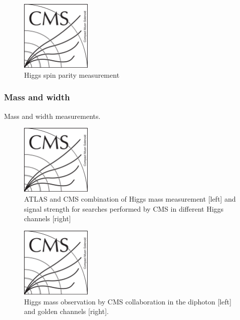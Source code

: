 \begin{figure}[!Hhtbp]
  \begin{center}
    \includegraphics[width=0.3\textwidth]{figs/CMSlogo.png}
    \caption{Higgs spin parity measurement}
    \label{fig:HiggsSpinParity}
  \end{center}
\end{figure}

\subsubsection{Mass and width}

Mass and width measurements.

\begin{figure}[!Hhtbp]
  \begin{center}
    \includegraphics[width=0.3\textwidth]{figs/CMSlogo.png}
    \caption{ATLAS and CMS combination of Higgs mass measurement [left] and signal strength for searches performed by CMS in different Higgs channels [right]}
    \label{fig:HiggsMass}
  \end{center}
\end{figure}

\begin{figure}[!Hhtbp]
  \begin{center}
    \includegraphics[width=0.3\textwidth]{figs/CMSlogo.png}
    \caption{Higgs mass observation by CMS collaboration in the diphoton [left] and golden channels [right].}
    \label{fig:MassDiphotonMassGolden}
  \end{center}
\end{figure}


